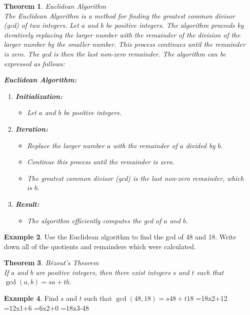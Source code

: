 \documentclass[letterpaper,10pt]{article}
\theoremstyle{plain}
\newtheorem{thm}{Theorem}[section]
\theoremstyle{definition}
\newtheorem{exmp}[thm]{Example}
\theoremstyle{remark}
\begin{document}
\begin{thm}{Euclidean Algorithm}$ $\\
The Euclidean Algorithm is a method for finding the greatest common divisor (gcd) of two integers. Let $a$ and $b$ be positive integers. The algorithm proceeds by iteratively replacing the larger number with the remainder of the division of the larger number by the smaller number. This process continues until the remainder is zero. The gcd is then the last non-zero remainder. The algorithm can be expressed as follows:

\textbf{Euclidean Algorithm:}

\begin{enumerate}
  \item \textbf{Initialization:}
    \begin{itemize}
      \item Let $a$ and $b$ be positive integers.
    \end{itemize}
  
  \item \textbf{Iteration:}
    \begin{itemize}
      \item Replace the larger number $a$ with the remainder of $a$ divided by $b$.
      \item Continue this process until the remainder is zero.
      \item The greatest common divisor (gcd) is the last non-zero remainder, which is $b$.
    \end{itemize}
  
  \item \textbf{Result:}
    \begin{itemize}
      \item The algorithm efficiently computes the gcd of $a$ and $b$.
    \end{itemize}
\end{enumerate}

\end{thm}
\begin{exmp}Use the Euclidean algorithm to find the gcd of 48 and 
18. Write down all of the quotients and remainders which were calculated.
\vspace{3cm}
\end{exmp}
\begin{thm}{Bézout's Theorem}$ $\\
If $a$ and $b$ are positive integers, then there exist integers $s$ and $t$ such that $\gcd(a, b) = sa + tb$.
\end{thm}
\begin{exmp}
Find $s$ and $t$ such that $\gcd(48,18)= s48 + t18$
=18x2+12
=12x1+6
=6x2+0
=18x3-48
\end{exmp}
\end{document}
